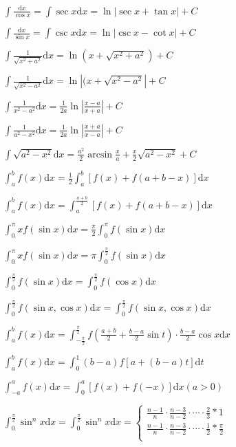 \begin{spacing}{\hangju}
    \noindent $\int{\frac{\mathrm{d}x}{\cos{x}}} = \int{\sec{x}}\mathrm{d}x = \ln{\left| \sec{x} + \tan{x} \right| } + C$

    \noindent $\int{\frac{\mathrm{d}x}{\sin{x}}} = \int{\csc{x}}\mathrm{d}x = \ln{\left| \csc{x} - \cot{x} \right| } + C$

    \noindent $\int{\frac{1}{\sqrt{x^2 + a^2}}}\mathrm{d}x = \ln{(x + \sqrt{x^2 + a ^2})} + C$

    \noindent $\int{\frac{1}{\sqrt{x^2 - a^2}}}\mathrm{d}x = \ln{\left|(x + \sqrt{x^2 - a ^2}\right|} + C$

    \noindent $\int{\frac{1}{x^2 - a^2}} \mathrm{d}x = \frac{1}{2a} \ln{\left| \frac{x - a}{x + a} \right|} + C$

    \noindent $\int{\frac{1}{a^2 - x^2}} \mathrm{d}x = \frac{1}{2a} \ln{\left| \frac{x + a}{x - a} \right|} + C$

    \noindent $\int{\sqrt{a^2 - x^2}}\mathrm{d}x = \frac{a^2}{2}\arcsin{\frac{x}{a}} + \frac{x}{2}\sqrt{a^2 - x^2} + C$

    \noindent $\int_{a}^{b}{f(x)}\mathrm{d}x = \frac{1}{2}\int_{a}^{b}{[f(x) + f(a + b - x)]}\mathrm{d}x$

    \noindent $\int_{a}^{b}{f(x)}\mathrm{d}x = \int_{a}^{\frac{a+b}{2}}{[f(x) + f(a + b - x)]}\mathrm{d}x$

    \noindent $\int_{0}^{\pi}{xf(\sin{x})}\mathrm{d}x = \frac{\pi}{2}\int_{0}^{\pi}{f(\sin{x})}\mathrm{d}x$

    \noindent $\int_{0}^{\pi}{xf(\sin{x})}\mathrm{d}x = \pi\int_{0}^{\frac{\pi}{2}}{f(\sin{x})}\mathrm{d}x$

    \noindent $\int_{0}^{\frac{\pi}{2}}{f(\sin{x})}\mathrm{d}x = \int_{0}^{\frac{\pi}{2}}{f(\cos{x})}\mathrm{d}x $

    \noindent $\int_{0}^{\frac{\pi}{2}}{f(\sin{x}, \cos{x})}\mathrm{d}x = \int_{0}^{\frac{\pi}{2}}{f(\sin{x}, \cos{x})}\mathrm{d}x $

    \noindent $\int_{a}^{b}{f(x)}\mathrm{d}x = \int_{-\frac{\pi}{2}}^{\frac{\pi}{2}}{f(\frac{a + b}{2} + \frac{b - a}{2}\sin{t}) \cdot \frac{b - a}{2}\cos{x}}\mathrm{d}x$

    \noindent $\int_{a}^{b}{f(x)}\mathrm{d}x = \int_{0}^{1}(b - a)f[a + (b - a)t]\mathrm{d}t$

    \noindent $\int_{-a}^{a}{f(x)}\mathrm{d}x = \int_{0}^{a}[f(x) + f(-x)]\mathrm{d}x (a > 0)$

    \noindent $\int_{0}^{\frac{\pi}{2}}{\sin^n{x}}\mathrm{d}x = \int_{0}^{\frac{\pi}{2}}{\sin^n{x}}\mathrm{d}x = \begin{cases}
        \frac{n - 1}{n} \cdot \frac{n - 3}{n - 2} \cdot \cdots  \cdot \frac{2}{3} * 1 \\
        \frac{n - 1}{n} \cdot \frac{n - 3}{n - 2} \cdot \cdots  \cdot \frac{1}{2} * \frac{\pi}{2} \\
    \end{cases}$


\end{spacing}
